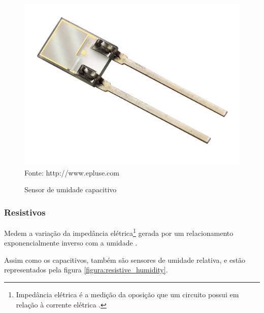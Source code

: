 \begin{figure}[h]
	\caption{Sensor de umidade capacitivo}
	\centering
	\includegraphics[scale=0.15]{../images/capacitive-humidity.jpg}
	\hspace{\linewidth}
	Fonte: http://www.epluse.com
	\label{figura:capacitive_humidity}
\end{figure}

\subsubsection{Resistivos}
Medem a variação da impedância elétrica\footnote{Impedância elétrica é a medição da oposição que um circuito
possui em relação à corrente elétrica \cite{britannica_2015}.} gerada por um relacionamento exponencialmente
inverso com a umidade \cite{fontesII2005}.

Assim como os capacitivos, também são sensores de umidade relativa, e estão representados pela figura
\ref{figura:resistive_humidity}.

